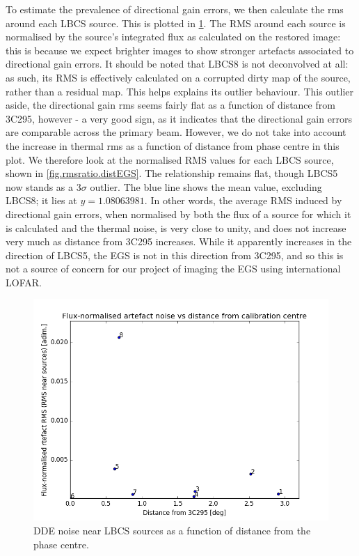 \pg
To estimate the prevalence of directional gain errors, we then calculate the rms around each LBCS source. This is plotted in \cref{fig.dderms.distEGS}. The RMS around each source is normalised by the source's integrated flux as calculated on the restored image: this is because we expect brighter images to show stronger artefacts associated to directional gain errors. It should be noted that LBCS8 is not deconvolved at all: as such, its RMS is effectively calculated on a corrupted dirty map of the source, rather than a residual map. This helps explains its outlier behaviour. This outlier aside, the directional gain rms seems fairly flat as a function of distance from 3C295, however - a very good sign, as it indicates that the directional gain errors are comparable across the primary beam. However, we do not take into account the increase in thermal rms as a function of distance from phase centre in this plot. We therefore look at the normalised RMS values for each LBCS source, shown in \cref{fig.rmsratio.distEGS}. The relationship remains flat, though LBCS5 now stands as a $3\sigma$ outlier. The blue line shows the mean value, excluding LBCS8; it lies at $y=1.08063981$. In other words, the average RMS induced by directional gain errors, when normalised by both the flux of a source for which it is calculated and the thermal noise, is very close to unity, and does not increase very much as distance from 3C295 increases. While it apparently increases in the direction of LBCS5, the EGS is not in this direction from 3C295, and so this is not a source of concern for our project of imaging the EGS using international LOFAR.
\begin{figure}[h!]
\includegraphics[width=0.8\linewidth]{images/ArtefactRMSvsDistFrom3c295.png}
\caption{DDE noise near LBCS sources as a function of distance from the phase centre.}%
\label{fig.dderms.distEGS}
\end{figure}
